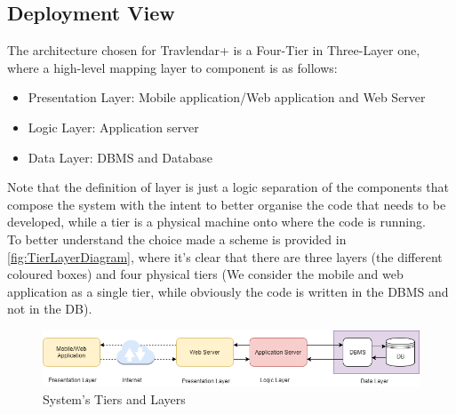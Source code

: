 \subsection{Deployment View}
The architecture chosen for Travlendar+ is a Four-Tier in Three-Layer one, where a high-level mapping layer to component is as follows:
\begin{itemize}
\item Presentation Layer: Mobile application/Web application and Web Server
\item Logic Layer: Application server
\item Data Layer: DBMS and Database
\end{itemize}
Note that the definition of layer is just a logic separation of the components that compose the system with the intent to better organise the code that needs to be developed, while a tier is a physical machine onto where the code is running.
\\To better understand the choice made a scheme is provided in \autoref{fig:TierLayerDiagram}, where it's clear that there are three layers (the different coloured boxes) and four physical tiers (We consider the mobile and web application as a single tier, while obviously the code is written in the DBMS and not in the DB).
\begin{figure}[h]
\includegraphics[width = \textwidth, keepaspectratio = true]{Img/TierLayerDiagram}
	\caption{System's Tiers and Layers}
	\label{fig:TierLayerDiagram}
\end{figure}
